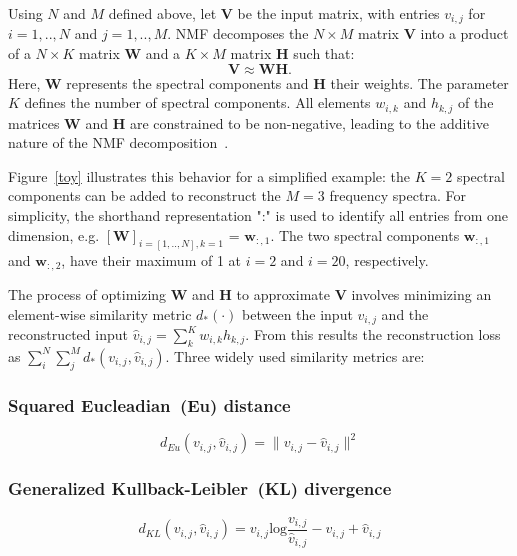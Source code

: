 \documentclass[lettersize,journal]{IEEEtran}
\begin{document}
Using $N$ and $M$ defined above, let $\mathbf{V}$ be the input matrix, with entries $v_{i,j}$ for $i=1,..,N$ and $j=1,..,M$. 
NMF decomposes the $N \times M$ matrix $\mathbf{V}$ into a product of a $N \times K$ matrix $\mathbf{W}$ and a $K \times M$ matrix $\mathbf{H}$ such that:
\begin{equation}
    \mathbf{V} \approx \mathbf{W}\mathbf{H}.
\end{equation}
Here, $\mathbf{W}$ represents the spectral components and $\mathbf{H}$ their weights.
The parameter $K$ defines the number of spectral components. 
All elements $w_{i,k}$ and $h_{k,j}$ of the matrices $\mathbf{W}$ and $\mathbf{H}$ are constrained to be non-negative, leading to the additive nature of the NMF decomposition~\cite{Lee1999}.

Figure~\ref{toy} illustrates this behavior for a simplified example: the $K=2$ spectral components can be added to reconstruct the $M=3$ frequency spectra.
For simplicity, the shorthand representation ":" is used to identify all entries from one dimension, e.g. $[\mathbf{W}]_{i=[1,..,N],k=1}$ = $\mathbf{w}_{:,1}$.
The two spectral components $\mathbf{w}_{:,1}$ and $\mathbf{w}_{:,2}$, have their maximum of 1 at $i=2$ and $i={20}$, respectively.

The process of optimizing $\mathbf{W}$ and $\mathbf{H}$ to approximate $\mathbf{V}$ involves minimizing an element-wise similarity metric $d_*(\cdot)$ between the input $v_{i,j}$ and the reconstructed input $\hat{v}_{i,j} = \sum^K_k w_{i,k} h_{k,j}$. From this results the reconstruction loss as $\sum^N_i\sum^M_j d_*(v_{i,j}, \hat{v}_{i,j})$.
Three widely used similarity metrics are: \subsubsection{Squared Eucleadian~(Eu) distance~\cite{Lee2000}}
\begin{equation}
    d_{Eu}({v}_{i,j}, \hat{v}_{i,j}) = \lVert {v}_{i,j} -\hat{v}_{i,j}\lVert ^2
    \label{dEU}
\end{equation}
\subsubsection{Generalized Kullback-Leibler~(KL) divergence~\cite{kompass2007generalized}}
\begin{equation}
    d_{KL}({v}_{i,j}, \hat{v}_{i,j}) = {v}_{i,j} \text{log} \frac{{v}_{i,j}}{\hat{v}_{i,j}} - {v}_{i,j}  +\hat{v}_{i,j} 
    \label{dKL}
\end{equation}
\end{document}
